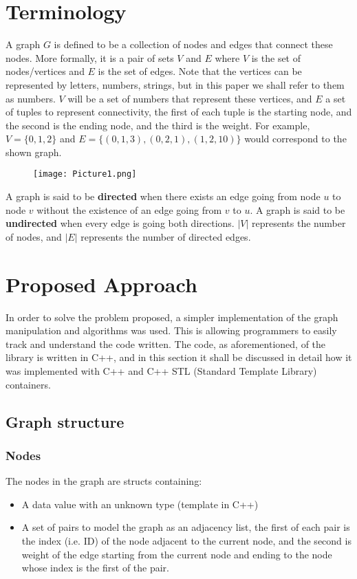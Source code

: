 \documentclass[a4paper,12pt]{article}
\begin{document}
\section{Terminology}
\hspace{0.8cm}A graph $G$ is defined to be a collection of nodes and edges that connect these nodes. More formally, it is a pair of sets $V$ and $E$ where $V$ is the set of nodes/vertices and $E$ is the set of edges. Note that the vertices can be represented by letters, numbers, strings, but in this paper we shall refer to them as numbers. $V$ will be a set of numbers that represent these vertices, and $E$ a set of tuples to represent connectivity, the first of each tuple is the starting node, and the second is the ending node, and the third is the weight. For example, $V=\{0,1,2\}$ and $E=\{(0,1,3),(0,2,1),(1,2,10)\}$ would correspond to the shown graph.
\begin{figure}[h]
\centering
\texttt{[image: Picture1.png]}
\end{figure}
A graph is said to be \textbf{directed} when there exists an edge going from node $u$ to node $v$ without the existence of an edge going from $v$ to $u$. A graph is said to be \textbf{undirected} when every edge is going both directions.
$|V|$ represents the number of nodes, and $|E|$ represents the number of directed edges.
\section{Proposed Approach}
In order to solve the problem proposed, a simpler implementation of the graph manipulation and algorithms was used. This is allowing programmers to easily track and understand the code written. The code, as aforementioned, of the library is written in C++, and in this section it shall be discussed in detail how it was implemented with C++ and C++ STL (Standard Template Library) containers.
\subsection{Graph structure}
\subsubsection{Nodes}

The nodes in the graph are structs containing:

\begin{itemize}
    \item A data value with an unknown type (template in C++)
    \item A set of pairs to model the graph as an adjacency list, the first of each pair is the index (i.e. ID) of the node adjacent to the current node, and the second is weight of the edge starting from the current node and ending to the node whose index is the first of the pair.
\end{itemize}
\end{document}
